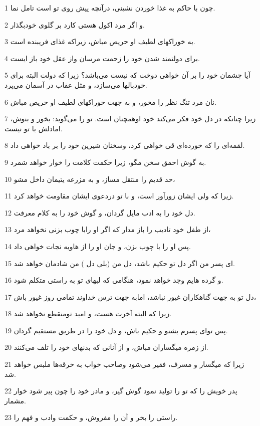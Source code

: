 \par 1 چون با حاکم به غذا خوردن نشینی، درآنچه پیش روی تو است تامل نما.
\par 2 و اگر مرد اکول هستی کارد بر گلوی خودبگذار.
\par 3 به خوراکهای لطیف او حریص مباش، زیراکه غذای فریبنده است.
\par 4 برای دولتمند شدن خود را زحمت مرسان واز عقل خود باز ایست.
\par 5 آیا چشمان خود را بر آن خواهی دوخت که نیست می‌باشد؟ زیرا که دولت البته برای خودبالها می‌سازد، و مثل عقاب در آسمان می‌پرد.
\par 6 نان مرد تنگ نظر را مخور، و به جهت خوراکهای لطیف او حریص مباش.
\par 7 زیرا چنانکه در دل خود فکر می‌کند خود اوهمچنان است. تو را می‌گوید: بخور و بنوش، امادلش با تو نیست.
\par 8 لقمه‌ای را که خورده‌ای قی خواهی کرد، وسخنان شیرین خود را بر باد خواهی داد.
\par 9 به گوش احمق سخن مگو، زیرا حکمت کلامت را خوار خواهد شمرد.
\par 10 حد قدیم را منتقل مساز، و به مزرعه یتیمان داخل مشو،
\par 11 زیرا که ولی ایشان زورآور است، و با تو دردعوی ایشان مقاومت خواهد کرد.
\par 12 دل خود را به ادب مایل گردان، و گوش خود را به کلام معرفت.
\par 13 از طفل خود تادیب را باز مدار که اگر او رابا چوب بزنی نخواهد مرد،
\par 14 پس او را با چوب بزن، و جان او را از هاویه نجات خواهی داد.
\par 15 ‌ای پسر من اگر دل تو حکیم باشد، دل من (بلی دل ) من شادمان خواهد شد.
\par 16 و گرده هایم وجد خواهد نمود، هنگامی که لبهای تو به راستی متکلم شود.
\par 17 دل تو به جهت گناهکاران غیور نباشد، امابه جهت ترس خداوند تمامی روز غیور باش،
\par 18 زیرا که البته آخرت هست، و امید تومنقطع نخواهد شد.
\par 19 پس تو‌ای پسرم بشنو و حکیم باش، و دل خود را در طریق مستقیم گردان.
\par 20 از زمره میگساران مباش، و از آنانی که بدنهای خود را تلف می‌کنند.
\par 21 زیرا که میگسار و مسرف، فقیر می‌شود وصاحب خواب به خرقه‌ها ملبس خواهد شد.
\par 22 پدر خویش را که تو را تولید نمود گوش گیر، و مادر خود را چون پیر شود خوار مشمار.
\par 23 راستی را بخر و آن را مفروش، و حکمت وادب و فهم را.
